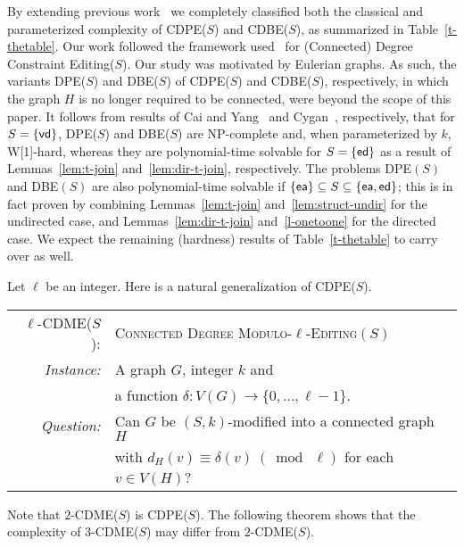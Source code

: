\documentclass[11pt]{llncs}
\newcommand{\vd}{{\sf vd}}
\newcommand{\ed}{{\sf ed}}
\newcommand{\ea}{{\sf ea}}
\newcommand{\cdpe}{{\sc CDPE}}
\newcommand{\dpe}{{\sc DPE}}
\newcommand{\cdbe}{{\sc CDBE}}
\newcommand{\dbe}{{\sc DBE}}
\newcommand{\NP}{{\sf NP}}
\newcommand{\W}{{\sf W[1]}}
\begin{document}
By extending previous work~\cite{BoeschST77,CaiY11,CyganMPPS14} we completely
classified both the classical and parameterized complexity of \cdpe($S$) and
\cdbe($S$), as summarized in Table~\ref{t-thetable}.  Our work followed the
framework used~\cite{Golovach13,MathiesonS12} for  {\sc (Connected) Degree
Constraint Editing($S$)}. 
Our study was motivated by Eulerian graphs. As such,
the variants \dpe($S$) and \dbe($S$) of \cdpe($S$) and \cdbe($S$),
respectively, in which the graph $H$ is no longer required to be connected,
were beyond the scope of this paper.  It follows from results of Cai and
Yang~\cite{CaiY11} and Cygan~\cite{CyganMPPS14}, respectively, that for
$S=\nobreak \{\vd\}$, \dpe($S$) and  \dbe($S$) are \NP-complete and, when parameterized
by $k$, \W-hard, whereas they are polynomial-time solvable for $S=\nobreak \{\ed\}$
as a result of Lemmas~\ref{lem:t-join} and~\ref{lem:dir-t-join}, respectively.
The problems \dpe$(S)$ and \dbe$(S)$ are also polynomial-time solvable if
$\{\ea\}\subseteq S \subseteq \{\ea,\ed\}$; this is in fact proven by combining
Lemmas~\ref{lem:t-join} and~\ref{lem:struct-undir} for the undirected case, and
Lemmas~\ref{lem:dir-t-join} and~\ref{l-onetoone} for the directed case.  We
expect the remaining (hardness) results of Table~\ref{t-thetable} to carry over
as well.

Let $\ell$ be an integer. Here is a natural generalization of \cdpe($S$).

\begin{center}
\begin{boxedminipage}{.99\textwidth}
\begin{tabular}{rl}
\textsc{$\ell$-CDME($S$):} & \textsc{Connected Degree Modulo-$\ell$-Editing$(S)$}\\
\textit{~~~~Instance:} & A graph $G$, integer $k$ and\\ & 
                        a function
                        $\delta\colon V(G)\rightarrow\{0,\ldots,\ell-1\}$.\\
\textit{Question:} & Can $G$ be $(S,k)$-modified into a connected graph $H$\\& with 
         $d_{H}(v)\equiv\delta(v)~(\bmod~\ell)$ for each $v\in V(H)$?
                   \end{tabular}
\end{boxedminipage}
\end{center}
Note that $2$-\textsc{CDME}($S$) is \cdpe($S$).  
The following theorem shows
that the complexity of $3$-\textsc{CDME}($S$) may differ from
$2$-\textsc{CDME}($S$).
\end{document}
